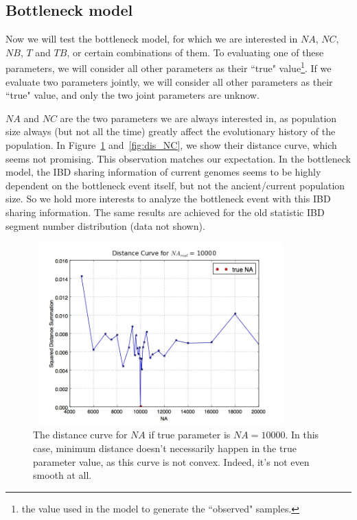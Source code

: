\documentclass{bioinfo}
\begin{document}
\subsection{Bottleneck model}

Now we will test the bottleneck model, for which we are interested in $NA$, $NC$, $NB$, $T$ and $TB$, or certain combinations of them. To evaluating one of these parameters, we will consider all other parameters as their \textquotedblleft true" value\footnote{the value used in the model to generate the \textquotedblleft observed" samples.}. If we evaluate two parameters jointly, we will consider all other parameters as their \textquotedblleft true" value, and only the two joint parameters are unknow.

$NA$ and $NC$ are the two parameters we are always interested in, as population size always (but not all the time) greatly affect the evolutionary history of the population. In Figure~\ref{fig:dis_NA} and~\ref{fig:dis_NC}, we show their distance curve, which seems not promising. This observation matches our expectation. In the bottleneck model, the IBD sharing information of current genomes seems to be highly dependent on the bottleneck event itself, but not the ancient/current population size. So we hold more interests to analyze the bottleneck event with this IBD sharing information. The same results are achieved for the old statistic IBD segment number distribution (data not shown).

\begin{figure}[h]
\centerline{\includegraphics[width=280pt, height=200pt]{like_NA.jpg}}
\caption{The distance curve for $NA$ if true parameter is $NA=10000$. In this case, minimum distance doesn't necessarily happen in the true parameter value, as this curve is not convex. Indeed, it's not even smooth at all.}\label{fig:dis_NA}
\end{figure}
\end{document}
